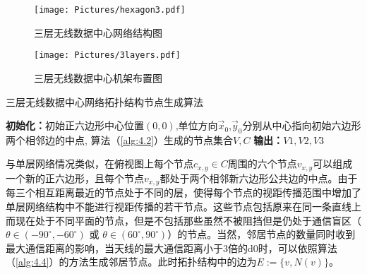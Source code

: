 \begin{figure}[htbp]
	\centering
	\texttt{[image: Pictures/hexagon3.pdf]}
	\caption{三层无线数据中心网络结构图}
	\label{fig:hexagon3}
\end{figure}

\begin{figure}[htbp]
	\centering
	\texttt{[image: Pictures/3layers.pdf]}
	\caption{三层无线数据中心机架布置图}
	\label{fig:3layer}
\end{figure}

\begin{algorithm}
	\SetAlgoLined
	\caption{三层无线数据中心网络拓扑结构节点生成算法} \label{alg:4.3}
	\textbf{初始化：}初始正六边形中心位置$(0,0)$,单位方向$\vec x_0$,$\vec y_0$分别从中心指向初始六边形两个相邻边的中点,
	算法（\ref{alg:4.2}）生成的节点集合$V,C$\;
	{
	}
	\textbf{输出：}$V1,V2,V3$
\end{algorithm}

与单层网络情况类似，在俯视图上每个节点$c_{x,y}\in C$周围的六个节点$v_{x,y}$可以组成一个新的正六边形，且每个节点$v_{x,y}$都处于两个相邻新六边形公共边的中点。由于每三个相互距离最近的节点处于不同的层，使得每个节点的视距传播范围中增加了单层网络结构中不能进行视距传播的若干节点。这些节点包括原来在同一条直线上而现在处于不同平面的节点，但是不包括那些虽然不被阻挡但是仍处于通信盲区（$\theta \in (-90^{\circ},-60^{\circ})$ 或 $\theta \in (60^{\circ},90^{\circ})$）的节点。当然，邻居节点的数量同时收到最大通信距离的影响，当天线的最大通信距离小于$3$倍的d$0$时，可以依照算法（\ref{alg:4.4}）的方法生成邻居节点。此时拓扑结构中的边为$E :={\{v,N(v)\} }$。

